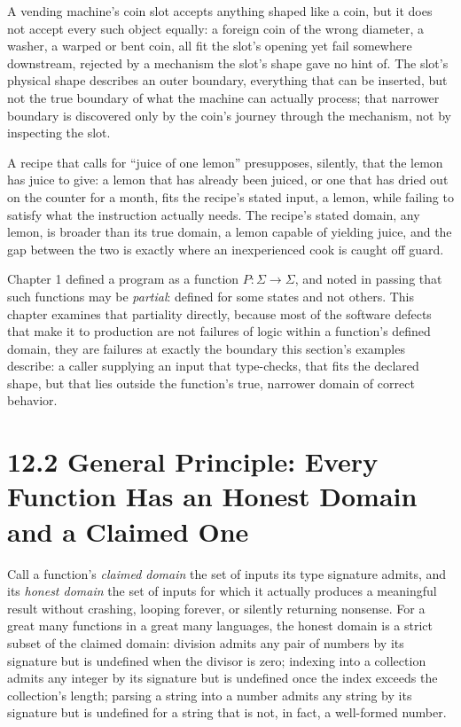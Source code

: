\documentclass[11pt]{book}
\begin{document}
A vending machine's coin slot accepts anything shaped like a coin, but it does not accept every such object equally: a foreign coin of the wrong diameter, a washer, a warped or bent coin, all fit the slot's opening yet fail somewhere downstream, rejected by a mechanism the slot's shape gave no hint of. The slot's physical shape describes an outer boundary, everything that can be inserted, but not the true boundary of what the machine can actually process; that narrower boundary is discovered only by the coin's journey through the mechanism, not by inspecting the slot.

A recipe that calls for ``juice of one lemon'' presupposes, silently, that the lemon has juice to give: a lemon that has already been juiced, or one that has dried out on the counter for a month, fits the recipe's stated input, a lemon, while failing to satisfy what the instruction actually needs. The recipe's stated domain, any lemon, is broader than its true domain, a lemon capable of yielding juice, and the gap between the two is exactly where an inexperienced cook is caught off guard.

Chapter 1 defined a program as a function $P: \Sigma \rightarrow \Sigma$, and noted in passing that such functions may be \emph{partial}: defined for some states and not others. This chapter examines that partiality directly, because most of the software defects that make it to production are not failures of logic within a function's defined domain, they are failures at exactly the boundary this section's examples describe: a caller supplying an input that type-checks, that fits the declared shape, but that lies outside the function's true, narrower domain of correct behavior.

\section*{12.2 General Principle: Every Function Has an Honest Domain and a Claimed One}

Call a function's \emph{claimed domain} the set of inputs its type signature admits, and its \emph{honest domain} the set of inputs for which it actually produces a meaningful result without crashing, looping forever, or silently returning nonsense. For a great many functions in a great many languages, the honest domain is a strict subset of the claimed domain: division admits any pair of numbers by its signature but is undefined when the divisor is zero; indexing into a collection admits any integer by its signature but is undefined once the index exceeds the collection's length; parsing a string into a number admits any string by its signature but is undefined for a string that is not, in fact, a well-formed number.
\end{document}
